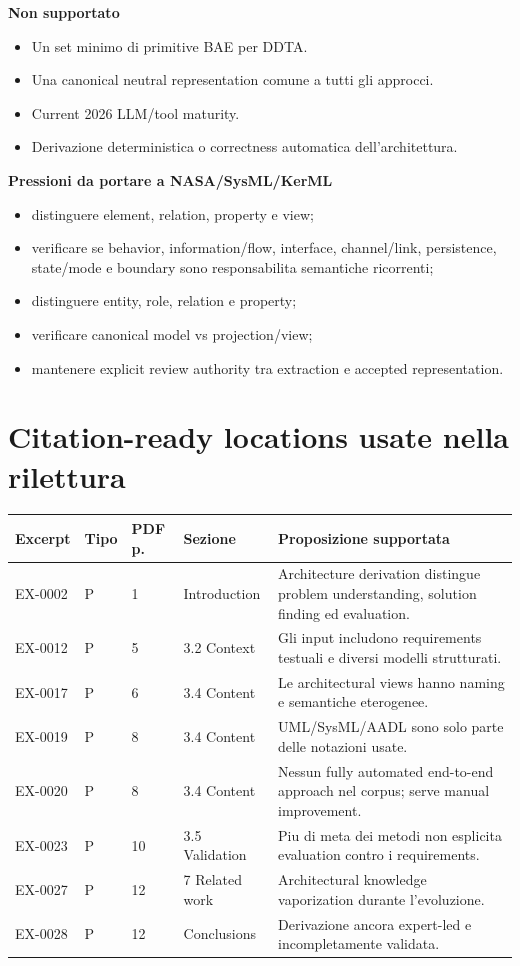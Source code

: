\documentclass[10.5pt,a4paper]{article}
\begin{document}
\textbf{Non supportato}
\begin{itemize}
\item Un set minimo di primitive BAE per DDTA.
\item Una canonical neutral representation comune a tutti gli approcci.
\item Current 2026 LLM/tool maturity.
\item Derivazione deterministica o correctness automatica dell'architettura.
\end{itemize}

\textbf{Pressioni da portare a NASA/SysML/KerML}
\begin{itemize}
\item distinguere element, relation, property e view;
\item verificare se behavior, information/flow, interface, channel/link, persistence, state/mode e boundary sono responsabilita semantiche ricorrenti;
\item distinguere entity, role, relation e property;
\item verificare canonical model vs projection/view;
\item mantenere explicit review authority tra extraction e accepted representation.
\end{itemize}

\section{Citation-ready locations usate nella rilettura}
\begin{longtable}{p{1.8cm}p{1.15cm}p{1.3cm}p{3.2cm}p{7.1cm}}
\toprule
Excerpt & Tipo & PDF p. & Sezione & Proposizione supportata\\
\midrule
\endhead
EX-0002 & P & 1 & Introduction & Architecture derivation distingue problem understanding, solution finding ed evaluation.\\
EX-0012 & P & 5 & 3.2 Context & Gli input includono requirements testuali e diversi modelli strutturati.\\
EX-0017 & P & 6 & 3.4 Content & Le architectural views hanno naming e semantiche eterogenee.\\
EX-0019 & P & 8 & 3.4 Content & UML/SysML/AADL sono solo parte delle notazioni usate.\\
EX-0020 & P & 8 & 3.4 Content & Nessun fully automated end-to-end approach nel corpus; serve manual improvement.\\
EX-0023 & P & 10 & 3.5 Validation & Piu di meta dei metodi non esplicita evaluation contro i requirements.\\
EX-0027 & P & 12 & 7 Related work & Architectural knowledge vaporization durante l'evoluzione.\\
EX-0028 & P & 12 & Conclusions & Derivazione ancora expert-led e incompletamente validata.\\
\bottomrule
\end{longtable}
\end{document}
